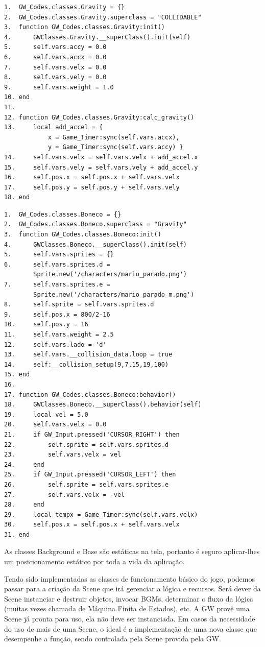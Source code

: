 \documentclass[
	12pt,				%
	openright,			%
	oneside,			%
	a4paper,			%
	brazil,				%
	]{abntex2}
\begin{document}
\begin{lstlisting}[caption={Classe Gravity},label=cod_ex_3,frame=single]
1.	GW_Codes.classes.Gravity = {}
2.	GW_Codes.classes.Gravity.superclass = "COLLIDABLE"
3.	function GW_Codes.classes.Gravity:init()
4.		GWClasses.Gravity.__superClass().init(self)
5.		self.vars.accy = 0.0
6.		self.vars.accx = 0.0
7.		self.vars.velx = 0.0
8.		self.vars.vely = 0.0
9.		self.vars.weight = 1.0
10.	end
11.
12.	function GW_Codes.classes.Gravity:calc_gravity()
13.		local add_accel = { 
			x = Game_Timer:sync(self.vars.accx), 
			y = Game_Timer:sync(self.vars.accy) } 
14.		self.vars.velx = self.vars.velx + add_accel.x
15.		self.vars.vely = self.vars.vely + add_accel.y
16.		self.pos.x = self.pos.x + self.vars.velx
17.		self.pos.y = self.pos.y + self.vars.vely
18.	end
\end{lstlisting}

\begin{lstlisting}[caption={Classe Boneco},label=cod_ex_4,frame=single]
1.	GW_Codes.classes.Boneco = {}
2.	GW_Codes.classes.Boneco.superclass = "Gravity"
3.	function GW_Codes.classes.Boneco:init()
4.		GWClasses.Boneco.__superClass().init(self)
5.		self.vars.sprites = {}
6.		self.vars.sprites.d = 
		Sprite.new('/characters/mario_parado.png')
7.		self.vars.sprites.e = 
		Sprite.new('/characters/mario_parado_m.png')
8.		self.sprite = self.vars.sprites.d
9.		self.pos.x = 800/2-16
10.		self.pos.y = 16
11.		self.vars.weight = 2.5
12.		self.vars.lado = 'd'
13.		self.vars.__collision_data.loop = true
14.		self:__collision_setup(9,7,15,19,100)
15.	end
16.
17.	function GW_Codes.classes.Boneco:behavior()
18.		GWClasses.Boneco.__superClass().behavior(self)
19.		local vel = 5.0
20.		self.vars.velx = 0.0
21.		if GW_Input.pressed('CURSOR_RIGHT') then
22.			self.sprite = self.vars.sprites.d
23.			self.vars.velx = vel
24.		end
25.		if GW_Input.pressed('CURSOR_LEFT') then
26.			self.sprite = self.vars.sprites.e
27.			self.vars.velx = -vel
28.		end
29.		local tempx = Game_Timer:sync(self.vars.velx)
30.		self.pos.x = self.pos.x + self.vars.velx
31.	end
\end{lstlisting}

As classes Background e Base são estáticas na tela, portanto é seguro aplicar-lhes um posicionamento estático por toda a vida da aplicação.

Tendo sido implementadas as classes de funcionamento básico do jogo, podemos passar para a criação da Scene que irá gerenciar a lógica e recursos. Será dever da Scene instanciar e destruir objetos, invocar BGMs, determinar o fluxo da lógica (muitas vezes chamada de Máquina Finita de Estados), etc. A GW provê uma Scene já pronta para uso, ela não deve ser instanciada. Em casos da necessidade do uso de mais de uma Scene, o ideal é a implementação de uma nova classe que desempenhe a função, sendo controlada pela Scene provida pela GW.
\end{document}
